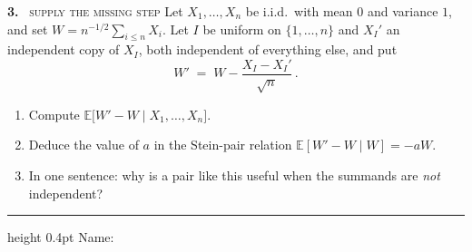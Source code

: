\documentclass[11pt]{article}
\newcommand{\E}{\mathbb{E}}
\begin{document}
\vspace{1.5em}

\textbf{3.} \ \textsc{\small supply the missing step} \quad Let $X_1,\dots,X_n$ be i.i.d.\ with mean $0$ and variance $1$, and set $W=n^{-1/2}\sum_{i\le n}X_i$. Let $I$ be uniform on $\{1,\dots,n\}$ and $X_I'$ an independent copy of $X_I$, both independent of everything else, and put
\[
W'\;=\;W-\frac{X_I-X_I'}{\sqrt n}\,.
\]

\begin{enumerate}[label=(\alph*),leftmargin=1.8em,itemsep=0.3em,topsep=0.3em]
\item Compute $\E\big[W'-W\mid X_1,\dots,X_n\big]$.
\item Deduce the value of $a$ in the Stein-pair relation $\E[W'-W\mid W]=-aW$.
\item In one sentence: why is a pair like this useful when the summands are \emph{not} independent?
\end{enumerate}

\vspace{1.6em}
\hrule height 0.4pt
\vspace{0.3em}
{\footnotesize\color{grey} Name:\hspace{16em}\hrulefill}
\end{document}
